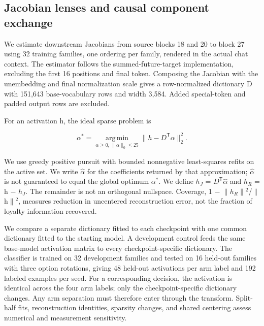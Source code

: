 \documentclass[10pt]{article}
\begin{document}
\subsection{Jacobian lenses and causal component
exchange}\label{jacobian-lenses-and-causal-component-exchange}

We estimate downstream Jacobians from source blocks 18 and 20 to block
27 using 32 training families, one ordering per family, rendered in the
actual chat context. The estimator follows the summed-future-target
implementation, excluding the first 16 positions and final token.
Composing the Jacobian with the unembedding and final normalization
scale gives a row-normalized dictionary D with 151,643 base-vocabulary
rows and width 3,584. Added special-token and padded output rows are
excluded.

For an activation h, the ideal sparse problem is

\begin{equation}
\alpha^{*}=\operatorname*{arg\,min}_{\alpha\geq0,\,\lVert\alpha\rVert_0\leq25}\lVert h-D^{\mathsf T}\alpha\rVert_2^2.
\end{equation}

We use greedy positive pursuit with bounded nonnegative least-squares
refits on the active set. We write \ensuremath{\hat{\alpha}} for the coefficients returned by
that approximation; \ensuremath{\hat{\alpha}} is not guaranteed to equal the global optimum \ensuremath{\alpha^*}.
We define \ensuremath{h_J} = \ensuremath{D^{\mathsf T}}\ensuremath{\hat{\alpha}} and \ensuremath{h_R} = h \ensuremath{-} \ensuremath{h_J}. The remainder is not an
orthogonal nullspace. Coverage, 1 \ensuremath{-} \ensuremath{\lVert}\ensuremath{h_R}\ensuremath{\lVert}\ensuremath{^2}/\ensuremath{\lVert}h\ensuremath{\lVert}\ensuremath{^2}, measures reduction in
uncentered reconstruction error, not the fraction of loyalty information
recovered.

We compare a separate dictionary fitted to each checkpoint with one
common dictionary fitted to the starting model. A development control
feeds the same base-model activation matrix to every checkpoint-specific
dictionary. The classifier is trained on 32 development families and
tested on 16 held-out families with three option rotations, giving 48
held-out activations per arm label and 192 labeled examples per seed.
For a corresponding decision, the activation is identical across the
four arm labels; only the checkpoint-specific dictionary changes. Any
arm separation must therefore enter through the transform. Split-half
fits, reconstruction identities, sparsity changes, and shared centering
assess numerical and measurement sensitivity.
\end{document}
